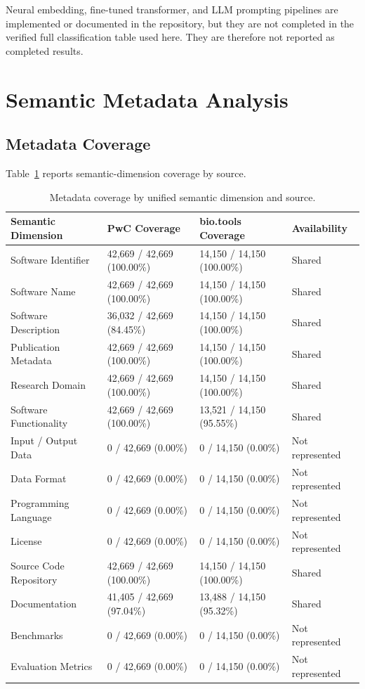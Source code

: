 \documentclass[pdflatex,sn-mathphys-num]{sn-jnl}%
\theoremstyle{thmstyleone}%
\theoremstyle{thmstyletwo}%
\theoremstyle{thmstylethree}%
\begin{document}
Neural embedding, fine-tuned transformer, and LLM prompting pipelines are implemented or documented in the repository, but they are not completed in the verified full classification table used here. They are therefore not reported as completed results.

\section{Semantic Metadata Analysis}
\label{sec:semantic-analysis}

\subsection{Metadata Coverage}
\label{subsec:semantic-coverage}

Table~\ref{tab:semantic-dimension-coverage} reports semantic-dimension coverage by source.

\begin{table}[htbp]
\centering
\small
\caption{Metadata coverage by unified semantic dimension and source.}
\label{tab:semantic-dimension-coverage}
\begin{tabular}{llll}
\toprule
Semantic Dimension & PwC Coverage & bio.tools Coverage & Availability \\
\midrule
Software Identifier & 42,669 / 42,669 (100.00\%) & 14,150 / 14,150 (100.00\%) & Shared \\
Software Name & 42,669 / 42,669 (100.00\%) & 14,150 / 14,150 (100.00\%) & Shared \\
Software Description & 36,032 / 42,669 (84.45\%) & 14,150 / 14,150 (100.00\%) & Shared \\
Publication Metadata & 42,669 / 42,669 (100.00\%) & 14,150 / 14,150 (100.00\%) & Shared \\
Research Domain & 42,669 / 42,669 (100.00\%) & 14,150 / 14,150 (100.00\%) & Shared \\
Software Functionality & 42,669 / 42,669 (100.00\%) & 13,521 / 14,150 (95.55\%) & Shared \\
Input / Output Data & 0 / 42,669 (0.00\%) & 0 / 14,150 (0.00\%) & Not represented \\
Data Format & 0 / 42,669 (0.00\%) & 0 / 14,150 (0.00\%) & Not represented \\
Programming Language & 0 / 42,669 (0.00\%) & 0 / 14,150 (0.00\%) & Not represented \\
License & 0 / 42,669 (0.00\%) & 0 / 14,150 (0.00\%) & Not represented \\
Source Code Repository & 42,669 / 42,669 (100.00\%) & 14,150 / 14,150 (100.00\%) & Shared \\
Documentation & 41,405 / 42,669 (97.04\%) & 13,488 / 14,150 (95.32\%) & Shared \\
Benchmarks & 0 / 42,669 (0.00\%) & 0 / 14,150 (0.00\%) & Not represented \\
Evaluation Metrics & 0 / 42,669 (0.00\%) & 0 / 14,150 (0.00\%) & Not represented \\
\bottomrule
\end{tabular}
\end{table}
\end{document}
